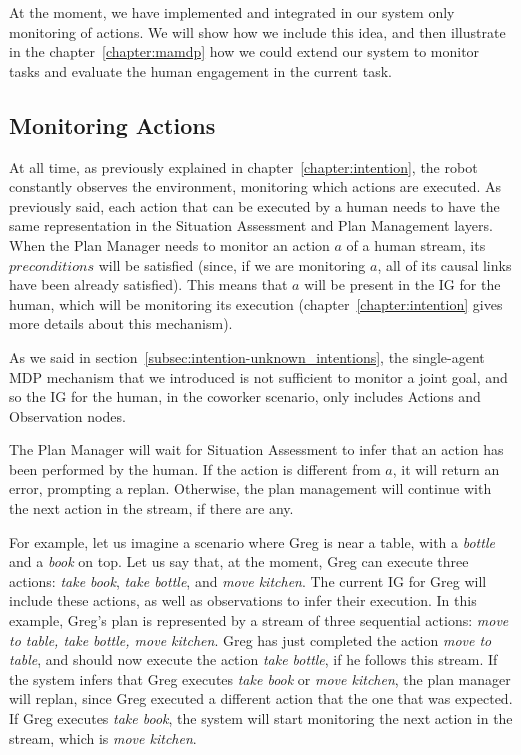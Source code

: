 At the moment, we have implemented and integrated in our system only monitoring of actions. We will show how we include this idea, and then illustrate in the chapter~\ref{chapter:mamdp} how we could extend our system to monitor tasks and evaluate the human engagement in the current task.

\subsection{Monitoring Actions}
At all time, as previously explained in chapter~\ref{chapter:intention}, the robot constantly observes the environment, monitoring which actions are executed. As previously said, each action that can be executed by a human needs to have the same representation in the Situation Assessment and Plan Management layers. When the Plan Manager needs to monitor an action $a$ of a human stream, its $preconditions$ will be satisfied (since, if we are monitoring $a$, all of its causal links have been already satisfied). This means that $a$ will be present in the IG for the human, which will be monitoring its execution (chapter~\ref{chapter:intention} gives more details about this mechanism).

As we said in section~\ref{subsec:intention-unknown_intentions}, the single-agent MDP mechanism that we introduced is not sufficient to monitor a joint goal, and so the IG for the human, in the coworker scenario, only includes Actions and Observation nodes.

The Plan Manager will wait for Situation Assessment to infer that an action has been performed by the human. If the action is different from $a$, it will return an error, prompting a replan. Otherwise, the plan management will continue with the next action in the stream, if there are any.

For example, let us imagine a scenario where Greg is near a table, with a \textit{bottle} and a \textit{book} on top. Let us say that, at the moment, Greg can execute three actions: \textit{take book}, \textit{take bottle}, and \textit{move kitchen}. The current IG for Greg will include these actions, as well as observations to infer their execution. In this example, Greg's plan is represented by a stream of three sequential actions: \textit{move to table, take bottle, move kitchen}. 
Greg has just completed the action \textit{move to table}, and should now execute the action \textit{take bottle}, if he follows this stream. If the system infers that Greg executes \textit{take book} or \textit{move kitchen}, the plan manager will replan, since Greg executed a different action that the one that was expected. If Greg executes \textit{take book}, the system will start monitoring the next action in the stream, which is \textit{move kitchen}.


